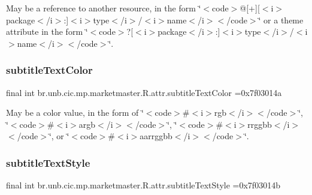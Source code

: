 May be a reference to another resource, in the form \char`\"{}$<$code$>$@\mbox{[}+\mbox{]}\mbox{[}$<$i$>$package$<$/i$>$\+:\mbox{]}$<$i$>$type$<$/i$>$/$<$i$>$name$<$/i$>$$<$/code$>$\char`\"{} or a theme attribute in the form \char`\"{}$<$code$>$?\mbox{[}$<$i$>$package$<$/i$>$\+:\mbox{]}$<$i$>$type$<$/i$>$/$<$i$>$name$<$/i$>$$<$/code$>$\char`\"{}. \mbox{\label{classbr_1_1unb_1_1cic_1_1mp_1_1marketmaster_1_1R_1_1attr_af522acc915726b0b4f30cc80a1ba117e}} 
\subsubsection{\texorpdfstring{subtitle\+Text\+Color}{subtitleTextColor}}
{\footnotesize\ttfamily final int br.\+unb.\+cic.\+mp.\+marketmaster.\+R.\+attr.\+subtitle\+Text\+Color =0x7f03014a\hspace{0.3cm}{\ttfamily [static]}}

May be a color value, in the form of \char`\"{}$<$code$>$\#$<$i$>$rgb$<$/i$>$$<$/code$>$\char`\"{}, \char`\"{}$<$code$>$\#$<$i$>$argb$<$/i$>$$<$/code$>$\char`\"{}, \char`\"{}$<$code$>$\#$<$i$>$rrggbb$<$/i$>$$<$/code$>$\char`\"{}, or \char`\"{}$<$code$>$\#$<$i$>$aarrggbb$<$/i$>$$<$/code$>$\char`\"{}. \mbox{\label{classbr_1_1unb_1_1cic_1_1mp_1_1marketmaster_1_1R_1_1attr_ac776930f274776ecf25a98da3499b7b7}} 
\subsubsection{\texorpdfstring{subtitle\+Text\+Style}{subtitleTextStyle}}
{\footnotesize\ttfamily final int br.\+unb.\+cic.\+mp.\+marketmaster.\+R.\+attr.\+subtitle\+Text\+Style =0x7f03014b\hspace{0.3cm}{\ttfamily [static]}}

